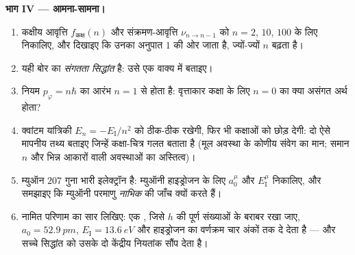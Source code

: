 \begin{problem}
\medskip\noindent\textbf{भाग IV --- आमना-सामना।}
\begin{enumerate}[resume]
  \item कक्षीय आवृत्ति $f_{\text{कक्ष}}(n)$ और संक्रमण-आवृत्ति
        $\nu_{n \to n-1}$ को $n = 2$, $10$,
        $100$ के लिए निकालिए, और दिखाइए कि उनका अनुपात $1$ की ओर जाता
        है, ज्यों-ज्यों $n$ बढ़ता है।
  \item यही बोर का \emph{संगतता सिद्धांत} है: उसे एक वाक्य में
        बताइए।
  \item नियम $p_\varphi = n\hbar$ का आरंभ $n = 1$ से होता है: वृत्ताकार
        कक्षा के लिए $n = 0$ का क्या असंगत अर्थ होता?
  \item क्वांटम यांत्रिकी $E_n = -E_{\text{I}}/n^2$ को ठीक-ठीक रखेगी,
        फिर भी कक्षाओं को छोड़ देगी: दो ऐसे मापनीय तथ्य बताइए जिन्हें
        कक्षा-चित्र गलत बताता है (मूल अवस्था के कोणीय संवेग का मान;
        समान $n$ और भिन्न आकारों वाली अवस्थाओं का अस्तित्व)।
  \item म्युऑन $207$ गुना भारी इलेक्ट्रॉन है: म्युऑनी
        हाइड्रोजन के लिए $a_0^\mu$ और $E_{\text{I}}^\mu$ निकालिए, और
        समझाइए कि म्युऑनी परमाणु \emph{नाभिक} की जाँच क्यों करते हैं।
  \item नामित परिणाम का सार लिखिए: एक , जिसे
        $h$ की पूर्ण संख्याओं के बराबर रखा जाए, $a_0 = \qty{52.9}{pm}$,
        $E_{\text{I}} = \qty{13.6}{eV}$ और हाइड्रोजन का वर्णक्रम चार
        अंकों तक दे देता है --- और सच्चे सिद्धांत को उसके दो केंद्रीय
        नियतांक सौंप देता है।
\end{enumerate}
\end{problem}
